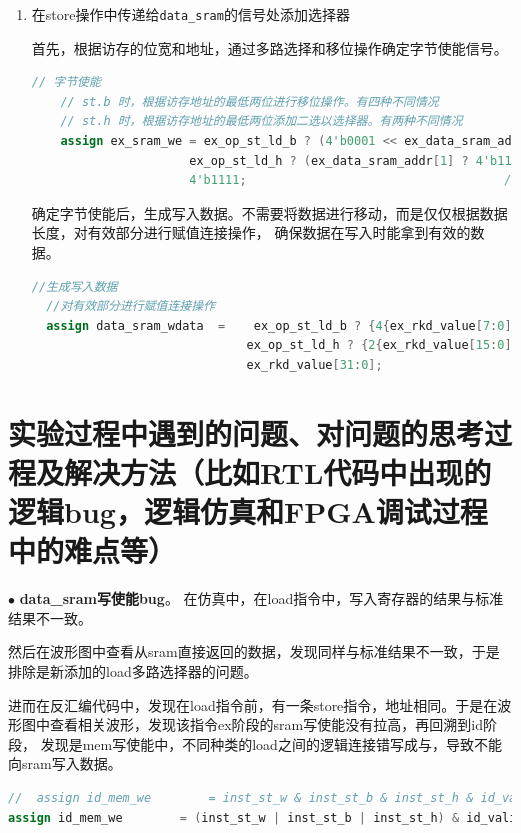 \documentclass[11pt]{article}
\begin{document}
\begin{enumerate}
  \item 在store操作中传递给\verb|data_sram|的信号处添加选择器
  
  首先，根据访存的位宽和地址，通过多路选择和移位操作确定字节使能信号。
  \begin{lstlisting}[language=verilog]
    // 字节使能
    // st.b 时，根据访存地址的最低两位进行移位操作。有四种不同情况
    // st.h 时，根据访存地址的最低两位添加二选以选择器。有两种不同情况
    assign ex_sram_we = ex_op_st_ld_b ? (4'b0001 << ex_data_sram_addr[1:0]) :           // st.b
                      ex_op_st_ld_h ? (ex_data_sram_addr[1] ? 4'b1100 : 4'b0011) :    // st.h
                      4'b1111;                                    // st.w
  \end{lstlisting}
  确定字节使能后，生成写入数据。不需要将数据进行移动，而是仅仅根据数据长度，对有效部分进行赋值连接操作，
  确保数据在写入时能拿到有效的数据。
\begin{lstlisting}[language=verilog]
  //生成写入数据
  //对有效部分进行赋值连接操作
  assign data_sram_wdata  =    ex_op_st_ld_b ? {4{ex_rkd_value[7:0]}}:
                              ex_op_st_ld_h ? {2{ex_rkd_value[15:0]}}:
                              ex_rkd_value[31:0];
\end{lstlisting}
\end{enumerate}


\vspace{1ex}

\section{实验过程中遇到的问题、对问题的思考过程及解决方法（比如RTL代码中出现的逻辑bug，逻辑仿真和FPGA调试过程中的难点等）}

\noindent
$\bullet$
\textbf{data_sram写使能bug}。
在仿真中，在load指令中，写入寄存器的结果与标准结果不一致。

然后在波形图中查看从sram直接返回的数据，发现同样与标准结果不一致，于是排除是新添加的load多路选择器的问题。

进而在反汇编代码中，发现在load指令前，有一条store指令，地址相同。于是在波形图中查看相关波形，发现该指令ex阶段的sram写使能没有拉高，再回溯到id阶段，
发现是mem写使能中，不同种类的load之间的逻辑连接错写成与，导致不能向sram写入数据。

\begin{lstlisting}[language=verilog]
//  assign id_mem_we        = inst_st_w & inst_st_b & inst_st_h & id_valid;  
assign id_mem_we        = (inst_st_w | inst_st_b | inst_st_h) & id_valid;  
\end{lstlisting}
\vspace{1ex}
\end{document}
